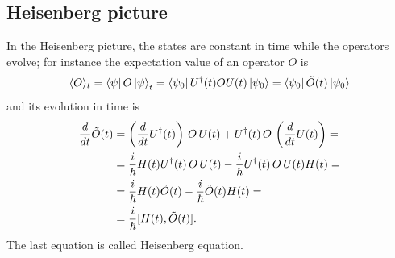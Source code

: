 \subsection{Heisenberg picture}

In the Heisenberg picture, the states are constant in time while the operators evolve; for instance the expectation value of an operator $O$ is 
\begin{align*}
    \langle O \rangle_t = \bra{\psi} O \ket{\psi}_t = \bra{\psi_0} U^\dagger(t) O U(t) \ket{\psi_0} = \bra{\psi_0} \Tilde{O}(t) \ket{\psi_0} 
\end{align*}
and its evolution in time is 
\begin{align*}
    \frac{d}{dt} \Tilde{O}(t) &= \left(\frac{d}{dt} U^\dagger(t)\right) \, O \, U(t) + U^\dagger(t) \, O \, \left( \frac{d}{dt} U(t) \right) = \\
    &= \frac{i}{\hbar} H(t) U^\dagger(t) \, O \, U(t) - \frac{i}{\hbar}U^\dagger(t) \, O \, U(t) H(t) = \\
    &= \frac{i}{\hbar} H(t) \Tilde{O}(t) - \frac{i}{\hbar} \Tilde{O}(t) H(t) = \\
    &= \frac{i}{\hbar} [H(t), \Tilde{O}(t)].
\end{align*}
The last equation is called Heisenberg equation. 


